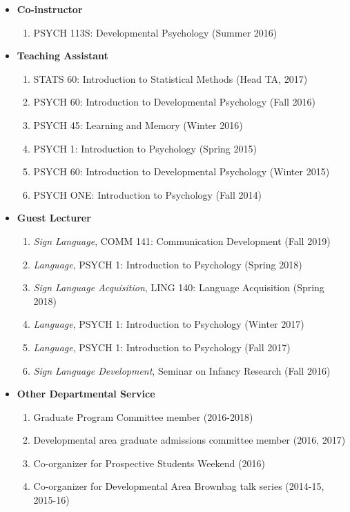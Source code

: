 \documentclass[10pt]{article}
\newenvironment{outerlist}[1][\enskip\textbullet]%
        {\begin{itemize}[#1,leftmargin=*]}{\end{itemize}%
         \vspace{-.6\baselineskip}}
\begin{document}
\begin{outerlist}

\item[] \textbf{Co-instructor}

\begin{enumerate}
        \item PSYCH 113S: Developmental Psychology (Summer 2016)
\end{enumerate}

\item[] \textbf{Teaching Assistant}

\begin{enumerate}[resume]
        \item STATS 60: Introduction to Statistical Methods (Head TA, 2017)
        \item PSYCH 60: Introduction to Developmental Psychology (Fall 2016)
        \item PSYCH 45: Learning and Memory (Winter 2016)
        \item PSYCH 1: Introduction to Psychology (Spring 2015)
        \item PSYCH 60: Introduction to Developmental Psychology (Winter 2015)
        \item PSYCH ONE: Introduction to Psychology (Fall 2014)
\end{enumerate}

\item[] \textbf{Guest Lecturer}

\begin{enumerate}[resume]
        \item \emph{Sign Language}, COMM 141: Communication Development (Fall 2019)
        \item \emph{Language}, PSYCH 1: Introduction to Psychology (Spring 2018)
        \item \emph{Sign Language Acquisition}, LING 140: Language Acquisition (Spring 2018)
        \item \emph{Language}, PSYCH 1: Introduction to Psychology (Winter 2017)
        \item \emph{Language}, PSYCH 1: Introduction to Psychology (Fall 2017)
        \item \emph{Sign Language Development}, Seminar on Infancy Research (Fall 2016)
\end{enumerate}

\item[] \textbf{Other Departmental Service}

\begin{enumerate}[resume]
        \item Graduate Program Committee member (2016-2018)
        \item Developmental area graduate admissions committee member (2016, 2017)
        \item Co-organizer for Prospective Students Weekend (2016)
        \item Co-organizer for Developmental Area Brownbag talk series (2014-15, 2015-16)
\end{enumerate} 


\end{outerlist}
    
\end{document}
